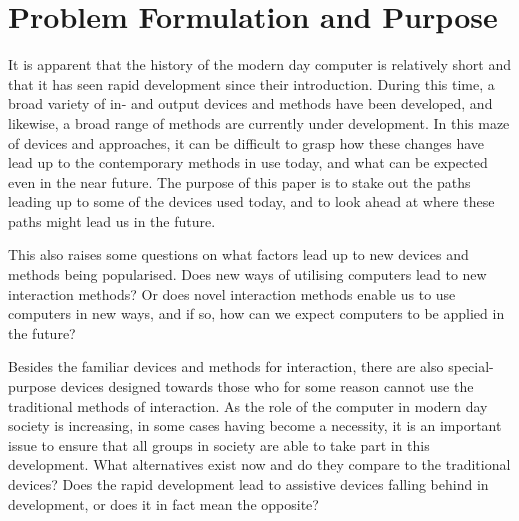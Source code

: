
\section{Problem Formulation and Purpose}
It is apparent that the history of the modern day computer is relatively short and that it has seen rapid development since their introduction. During this time, a broad variety of in- and output devices and methods have been developed, and likewise, a broad range of methods are currently under development. In this maze of devices and approaches, it can be difficult to grasp how these changes have lead up to the contemporary methods in use today, and what can be expected even in the near future. The purpose of this paper is to stake out the paths leading up to some of the devices used today, and to look ahead at where these paths might lead us in the future.

This also raises some questions on what factors lead up to new devices and methods being popularised. Does new ways of utilising computers lead to new interaction methods? Or does novel interaction methods enable us to use computers in new ways, and if so, how can we expect computers to be applied in the future?

Besides the familiar devices and methods for interaction, there are also special-purpose devices designed towards those who for some reason cannot use the traditional methods of interaction. As the role of the computer in modern day society is increasing, in some cases having become a necessity, it is an important issue to ensure that all groups in society are able to take part in this development. What alternatives exist now and do they compare to the traditional devices? Does the rapid development lead to assistive devices falling behind  in development, or does it in fact mean the opposite?

